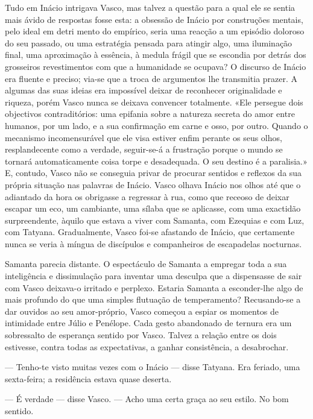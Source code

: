 Tudo em Inácio intrigava Vasco, mas talvez a questão para a qual ele se
sentia mais ávido de respostas fosse esta: a obsessão de Inácio por
construções mentais, pelo ideal em detri
mento do empírico, seria uma reacção a um episódio doloroso do seu
passado, ou uma estratégia pensada para atingir algo, uma iluminação
final, uma aproximação à essência, à medula frágil que se escondia por
detrás dos grosseiros revestimentos com que a humanidade se ocupava? O
discurso de Inácio era fluente e preciso; via-se que a troca de
argumentos lhe transmitia prazer. A algumas das suas ideias era
impossível deixar de reconhecer originalidade e riqueza, porém Vasco
nunca se deixava convencer totalmente. «Ele persegue dois objectivos
contraditórios: uma epifania sobre a natureza secreta do amor entre
humanos, por um lado, e a sua confirmação em carne e osso, por outro.
Quando o mecanismo incomensurável que ele visa estiver enfim perante os
seus olhos, resplandecente como a verdade, seguir-se-á a frustração
porque o mundo se tornará automaticamente coisa torpe e desadequada. O
seu destino é a paralisia.» E, contudo, Vasco não se conseguia privar de
procurar sentidos e reflexos da sua própria situação nas palavras de
Inácio. Vasco olhava Inácio nos olhos até que o adiantado da hora os
obrigasse a regressar à rua, como que receoso de deixar escapar um eco,
um cambiante, uma sílaba que se aplicasse, com uma exactidão
surpreendente, àquilo que estava a viver com Samanta, com Ezequias e com
Luz, com Tatyana. Gradualmente, Vasco foi-se afastando de Inácio, que
certamente nunca se veria à míngua de discípulos e companheiros de
escapadelas nocturnas.

Samanta parecia distante. O espectáculo de Samanta a
empregar toda a sua inteligência e dissimulação para inventar uma
desculpa que a dispensasse de sair com Vasco deixava-o irritado e
perplexo. Estaria Samanta a esconder-lhe algo de mais profundo do que
uma simples flutuação de temperamento? Recusando-se a dar ouvidos ao
seu amor-próprio, Vasco começou a espiar os momentos de intimidade entre Júlio e Penélope. Cada
gesto abandonado de ternura era um sobressalto de esperança sentido
por Vasco. Talvez a relação entre os dois estivesse, contra todas as
expectativas, a ganhar consistência, a desabrochar.

--- Tenho-te visto muitas vezes com o Inácio --- disse Tatyana. Era
  feriado, uma sexta-feira; a residência estava quase deserta.

--- É verdade --- disse Vasco. --- Acho uma certa graça ao seu estilo. No
  bom sentido.

